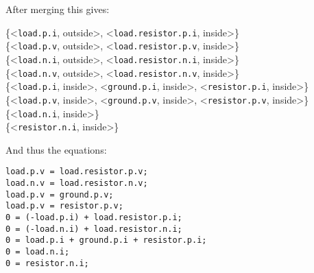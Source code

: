 \begin{example}
After merging this gives:

\{\textless{}\lstinline!load.p.i!, outside\textgreater{}, \textless{}\lstinline!load.resistor.p.i!, inside\textgreater{}\}\\
\{\textless{}\lstinline!load.p.v!, outside\textgreater{}, \textless{}\lstinline!load.resistor.p.v!, inside\textgreater{}\}\\
\{\textless{}\lstinline!load.n.i!, outside\textgreater{}, \textless{}\lstinline!load.resistor.n.i!, inside\textgreater{}\}\\
\{\textless{}\lstinline!load.n.v!, outside\textgreater{}, \textless{}\lstinline!load.resistor.n.v!, inside\textgreater{}\}\\
\{\textless{}\lstinline!load.p.i!, inside\textgreater{}, \textless{}\lstinline!ground.p.i!, inside\textgreater{}, \textless{}\lstinline!resistor.p.i!, inside\textgreater{}\}\\
\{\textless{}\lstinline!load.p.v!, inside\textgreater{}, \textless{}\lstinline!ground.p.v!, inside\textgreater{}, \textless{}\lstinline!resistor.p.v!, inside\textgreater{}\}\\
\{\textless{}\lstinline!load.n.i!, inside\textgreater{}\}\\
\{\textless{}\lstinline!resistor.n.i!, inside\textgreater{}\}

And thus the equations:
\begin{lstlisting}[language=modelica]
load.p.v = load.resistor.p.v;
load.n.v = load.resistor.n.v;
load.p.v = ground.p.v;
load.p.v = resistor.p.v;
0 = (-load.p.i) + load.resistor.p.i;
0 = (-load.n.i) + load.resistor.n.i;
0 = load.p.i + ground.p.i + resistor.p.i;
0 = load.n.i;
0 = resistor.n.i;
\end{lstlisting}
\end{example}

